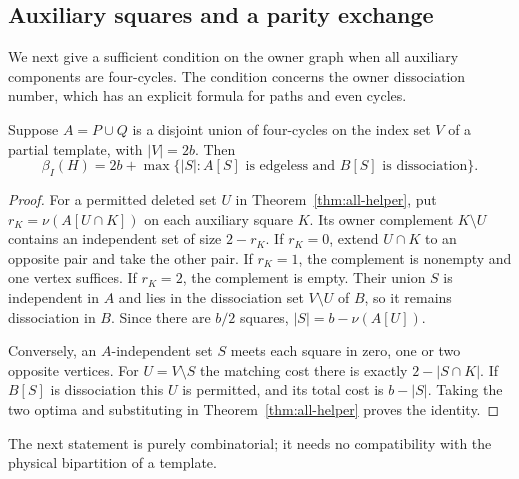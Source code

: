 \subsection{Auxiliary squares and a parity exchange}

We next give a sufficient condition on the owner graph when all auxiliary
components are four-cycles. The condition concerns the owner dissociation
number, which has an explicit formula for paths and even cycles.

\begin{lemma}\label{lem:auxiliary-square-normalization}
Suppose $A=P\cup Q$ is a disjoint union of four-cycles on the index set $V$
of a partial template, with $|V|=2b$. Then
\[
 \beta_I(H)=2b+
 \max\{|S|:A[S]\text{ is edgeless and }B[S]\text{ is dissociation}\}.
\]
\end{lemma}
\begin{proof}
For a permitted deleted set $U$ in Theorem~\ref{thm:all-helper}, put
$r_K=\nu(A[U\cap K])$ on each auxiliary square $K$.
Its owner complement $K\setminus U$ contains an independent set of size
$2-r_K$. If $r_K=0$, extend $U\cap K$ to an opposite pair and take the other
pair. If $r_K=1$, the complement is nonempty and one vertex suffices.
If $r_K=2$, the complement is empty. Their union $S$ is independent in $A$
and lies in the dissociation set $V\setminus U$ of $B$, so it remains
dissociation in $B$. Since there are $b/2$ squares,
$|S|=b-\nu(A[U])$.

Conversely, an $A$-independent set $S$ meets each square in zero, one or two
opposite vertices. For $U=V\setminus S$ the matching cost there is exactly
$2-|S\cap K|$. If $B[S]$ is dissociation this $U$ is permitted, and its total
cost is $b-|S|$. Taking the two optima and substituting in
Theorem~\ref{thm:all-helper} proves the identity.
\end{proof}

The next statement is purely combinatorial; it needs no compatibility with
the physical bipartition of a template.

